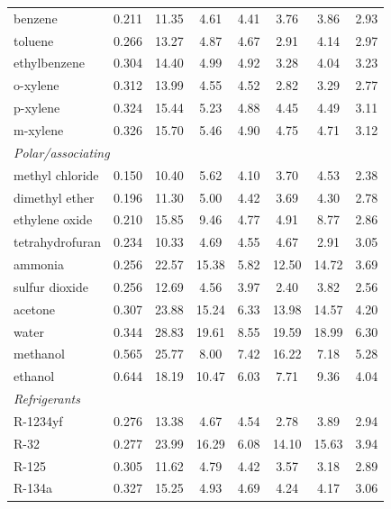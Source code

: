 \begin{table}[H]
\begin{tabular}{lccccccc}
benzene & 0.211 & 11.35 & 4.61 & 4.41 & 3.76 & 3.86 & 2.93 \\
toluene & 0.266 & 13.27 & 4.87 & 4.67 & 2.91 & 4.14 & 2.97 \\
ethylbenzene & 0.304 & 14.40 & 4.99 & 4.92 & 3.28 & 4.04 & 3.23 \\
o-xylene & 0.312 & 13.99 & 4.55 & 4.52 & 2.82 & 3.29 & 2.77 \\
p-xylene & 0.324 & 15.44 & 5.23 & 4.88 & 4.45 & 4.49 & 3.11 \\
m-xylene & 0.326 & 15.70 & 5.46 & 4.90 & 4.75 & 4.71 & 3.12 \\
\multicolumn{8}{l}{\emph{Polar/associating}} \\
methyl chloride & 0.150 & 10.40 & 5.62 & 4.10 & 3.70 & 4.53 & 2.38 \\
dimethyl ether & 0.196 & 11.30 & 5.00 & 4.42 & 3.69 & 4.30 & 2.78 \\
ethylene oxide & 0.210 & 15.85 & 9.46 & 4.77 & 4.91 & 8.77 & 2.86 \\
tetrahydrofuran & 0.234 & 10.33 & 4.69 & 4.55 & 4.67 & 2.91 & 3.05 \\
ammonia & 0.256 & 22.57 & 15.38 & 5.82 & 12.50 & 14.72 & 3.69 \\
sulfur dioxide & 0.256 & 12.69 & 4.56 & 3.97 & 2.40 & 3.82 & 2.56 \\
acetone & 0.307 & 23.88 & 15.24 & 6.33 & 13.98 & 14.57 & 4.20 \\
water & 0.344 & 28.83 & 19.61 & 8.55 & 19.59 & 18.99 & 6.30 \\
methanol & 0.565 & 25.77 & 8.00 & 7.42 & 16.22 & 7.18 & 5.28 \\
ethanol & 0.644 & 18.19 & 10.47 & 6.03 & 7.71 & 9.36 & 4.04 \\
\multicolumn{8}{l}{\emph{Refrigerants}} \\
R-1234yf & 0.276 & 13.38 & 4.67 & 4.54 & 2.78 & 3.89 & 2.94 \\
R-32 & 0.277 & 23.99 & 16.29 & 6.08 & 14.10 & 15.63 & 3.94 \\
R-125 & 0.305 & 11.62 & 4.79 & 4.42 & 3.57 & 3.18 & 2.89 \\
R-134a & 0.327 & 15.25 & 4.93 & 4.69 & 4.24 & 4.17 & 3.06 \\
\bottomrule
\end{tabular}
\end{table}
